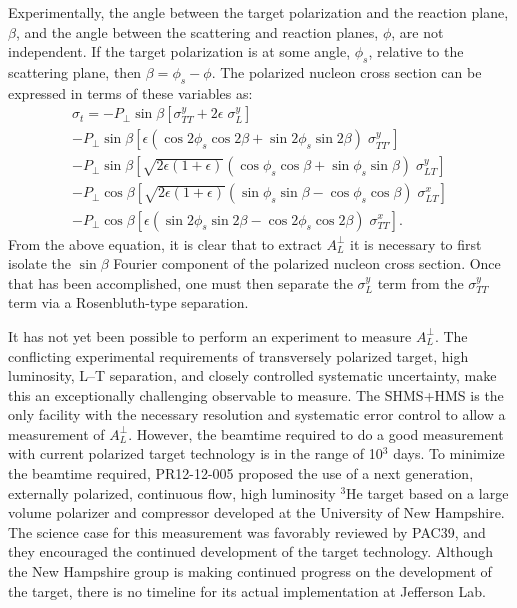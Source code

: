Experimentally, the angle between the target polarization and the reaction
plane, $\beta$, and the angle between the scattering and reaction planes,
$\phi$, are not independent.  If the target polarization is at some angle,
$\phi_s$, relative to the scattering plane, then $\beta = \phi_s-\phi$.  
The polarized nucleon cross section can be expressed \cite{Ba73} 
in terms of these variables as:
\begin{multline}\label{eqn:sigtarg}
\sigma_t =  - P_\perp \sin \beta \left[\sigma^y_{TT}+ 2\epsilon \; 
  \sigma^y_L \right] \\
- P_\perp \sin \beta \left[\epsilon (\cos 2\phi_s \cos 2\beta + 
  \sin 2\phi_s \sin 2\beta) \; \sigma^y_{TT'} \right]\\
- P_\perp \sin \beta \left[\sqrt{2\epsilon(1+\epsilon)}(\cos \phi_s \cos \beta 
  + \sin \phi_s \sin \beta) \; \sigma^y_{LT}\right] \\
-P_\perp \cos \beta \left[\sqrt{2\epsilon(1+\epsilon)}(\sin \phi_s \sin \beta 
  - \cos \phi_s \cos \beta)\; \sigma^x_{LT} \right]\\
-P_\perp \cos \beta \left[\epsilon (\sin 2\phi_s \sin 2\beta 
  - \cos 2\phi_s \cos 2\beta)  \; \sigma^x_{TT} \right] .
\end{multline}
From the above equation, it is clear that to extract $A_L^{\perp}$
it is necessary to first isolate the 
$\sin \beta$ Fourier component of the polarized nucleon cross section.
Once that has been accomplished, one must then separate the $\sigma_L^y$ term 
from the $\sigma_{TT}^y$ term via a Rosenbluth-type separation.

It has not yet been possible to perform an experiment to measure $A_L^{\perp}$.
The conflicting experimental requirements of transversely polarized target,
high luminosity, L--T separation, and closely controlled systematic
uncertainty, make this an exceptionally challenging observable to measure.  The
SHMS+HMS is the only facility with the necessary resolution and systematic
error control to allow a measurement of $A_L^{\perp}$.  However, the beamtime
required to do a good measurement with current polarized target technology is
in the range of 10$^3$ days.  To minimize the beamtime required, PR12-12-005
\cite{atpi39}
proposed the use of a next generation, externally polarized, continuous flow,
high luminosity $^3$He target based on a large volume polarizer and compressor
developed at the University of New Hampshire.  The science case
for this measurement was favorably reviewed by PAC39, and they encouraged the
continued development of the target technology.  Although the New Hampshire
group is making continued progress on the development of the target, there is
no timeline for its actual implementation at Jefferson Lab.


